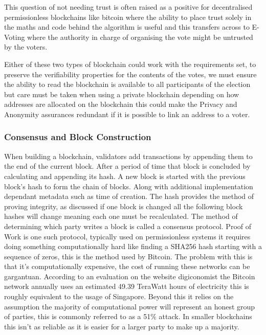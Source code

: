 \documentclass{entcs}
\begin{document}
This question of not needing trust \cite{lemieux2016trusting} is often raised as a positive for decentralised permissionless blockchains like bitcoin where the ability to place trust solely in the maths and code behind the algorithm is useful and this transfers across to E-Voting where the authority in charge of organising the vote might be untrusted by the voters.

Either of these two types of blockchain could work with the requirements set, to preserve the verifiability properties for the contents of the votes, we must ensure the ability to read the blockchain is available to all participants of the election but care must be taken when using a private blockchain depending on how addresses are allocated on the blockchain this could make the Privacy and Anonymity assurances redundant if it is possible to link an address to a voter.

\subsubsection{Consensus and Block Construction} \label{sec: consensus}

When building a blockchain, validators add transactions by appending them to the end of the current block. After a period of time that block is concluded by calculating and appending its hash. A new block is started with the previous block's hash to form the chain of blocks. Along with additional implementation dependant metadata such as time of creation. The hash provides the method of proving integrity, as discussed if one block is changed all the following block hashes will change meaning each one must be recalculated. The method of determining which party writes a block is called a consensus protocol. 
Proof of Work\cite{BTCWhitepaper} is one such protocol, typically used on permissionless systems it requires doing something computationally hard like finding a SHA256 hash starting with a sequence of zeros, this is the method used by Bitcoin. The problem with this is that it's computationally expensive, the cost of running these networks can be gargantuan. According to an evaluation on the website digiconomist \cite{BTCenergy} the Bitcoin network annually uses an estimated 49.39 TeraWatt hours of electricity this is roughly equivalent to the usage of Singapore. Beyond this it relies on the assumption the majority of computational power will represent an honest group of parties, this is commonly referred to as a 51\% attack\cite{BTCWhitepaper}\cite{baliga2017understanding}. In smaller blockchains this isn't as reliable as it is easier for a larger party to make up a majority. 
\end{document}
